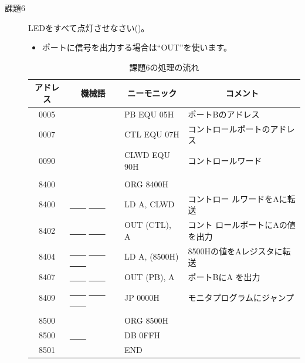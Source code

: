 \begin{description}
\item[課題6] LEDをすべて点灯させなさい()。

\begin{itemize}
\item ポートに信号を出力する場合は``OUT''を使います。
\end{itemize}

\begin{table}
\begin{center}
\caption{課題6の処理の流れ}
\label{tab:q1-6}
\small
\begin{tabular}{|c|l|l|l|}
\hline
アドレス& \multicolumn{1}{|c|}{機械語}&\multicolumn{1}{|c|}{ニーモニック}&\multicolumn{1}{|c|}{コメント}\\
\hline
   0005 &            &    PB EQU 05H& ポートBのアドレス\\
   0007 &            &    CTL EQU 07H& コントロールポートのアドレス\\
   0090 &            &    CLWD EQU 90H& コントロールワード\\
        &            &    &\\
   8400 &            &        ORG 8400H&\\
   8400 &  \underline{~~~~} \underline{~~~~}     &        LD A, CLWD& コントロー
                ルワードをAに転送\\
   8402 &  \underline{~~~~} \underline{~~~~}      &        OUT (CTL), A& コント
                ロールポートにAの値を出力\\
   8404 &  \underline{~~~~} \underline{~~~~} \underline{~~~~}   &        LD A,
            (8500H)& 8500Hの値をAレジスタに転送\\
   8407 &  \underline{~~~~} \underline{~~~~}     &        OUT (PB), A& ポートBにA
                を出力\\
   8409 &  \underline{~~~~} \underline{~~~~} \underline{~~~~}  &        JP
            0000H& モニタプログラムにジャンプ\\
        &            &    &\\
   8500 &            &        ORG 8500H&\\
   8500 &  \underline{~~~~}        &        DB 0FFH&\\
   8501 &            &        END&\\
\hline
\end{tabular}
\end{center}
\end{table}



\end{description}
